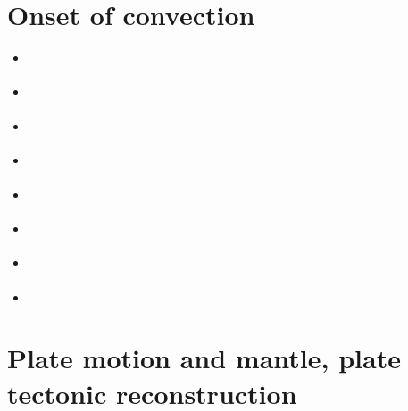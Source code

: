 \section{Onset of convection}

\begin{scriptsize}
\begin{itemize}
\item[\nineteeneightytwo] 
\textcite{homc82} 
\item[\nineteenninety] 
\textcite{sope90} 
\item[\twothousand] 
\textcite{scth00} 
\item[\twothousandsix] 
\textcite{soba06} 
\item[\twothousandtwo] 
\textcite{kojo02} 
\item[\twothousandtwo] 
\textcite{kojo03} 
\item[\twothousandseven] 
\textcite{soba07} 
\item[\twothousandfifteen] 
\textcite{kamo15} 
\end{itemize}
\end{scriptsize}

\section{Plate motion and mantle, plate tectonic reconstruction}

